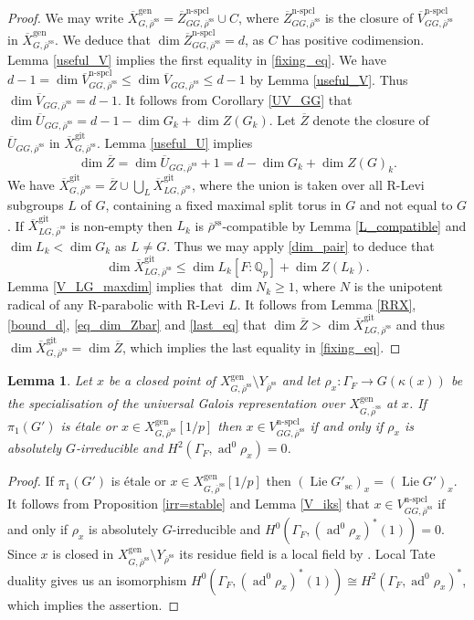 \documentclass{amsart}
\newtheorem{lem}[prop]{Lemma}
\theoremstyle{definition}
\theoremstyle{remark}
\newcommand{\Qp}{\mathbb {Q}_p}
\newcommand{\Zbar}{\overline{Z}}
\newcommand{\Vbar}{\overline{{V}}}
\DeclareMathOperator{\ad}{ad}
\newcommand{\rhobar}{\overline{\rho}}
\newcommand{\gen}{\mathrm{gen}}
\newcommand{\gps}{\mathrm{git}}
\newcommand{\Xbar}{\overline{X}}
\DeclareMathOperator{\nspcl}{n-spcl}
\DeclareMathOperator{\Lie}{Lie}
\newcommand{\rhobarss}{\rhobar^{\mathrm{ss}}}
\newcommand{\Ubar}{\overline{U}}
\newcommand{\sic}{\operatorname{sc}}
\begin{document}
\begin{proof}
We may write $\Xbar^{\gen}_{G, \rhobarss} = \Zbar^{\nspcl}_{GG, \rhobarss} \cup C$, where  $\Zbar^{\nspcl}_{GG, \rhobarss}$ is the closure of $\Vbar^{\nspcl}_{GG, \rhobarss}$ in $\Xbar^{\gen}_{G, \rhobarss}$. We deduce that $\dim \Zbar^{\nspcl}_{GG, \rhobarss}=d$, 
as $C$ has positive codimension.
Lemma \ref{useful_V} implies the first equality in \eqref{fixing_eq}. 
We have $d-1=\dim \Vbar^{\nspcl}_{GG, \rhobarss} \le \dim \Vbar_{GG, \rhobarss} \le d -1$ by Lemma \ref{useful_V}. Thus $\dim \Vbar_{GG, \rhobarss}= d-1$. 
It follows from Corollary \ref{UV_GG} that 
$\dim \Ubar_{GG, \rhobarss} = d - 1 -\dim G_k  +\dim Z(G_k).$
Let  $\Zbar$ denote the closure of $\Ubar_{GG, \rhobarss}$ in $\Xbar^{\gps}_{G, \rhobarss}$. 
Lemma \ref{useful_U} implies 
\begin{equation}\label{eq_dim_Zbar}
\dim \Zbar= \dim \Ubar_{GG, \rhobarss}+1= d- \dim G_k +\dim Z(G)_k.
\end{equation}
We have $\Xbar^{\gps}_{G, \rhobarss} = \Zbar \cup \bigcup_L \Xbar^{\gps}_{LG, \rhobarss}$, where 
the union is taken over all R-Levi subgroups $L$ of $G$,   containing a fixed maximal split torus in $G$ and not equal to $G$. If $\Xbar^{\gps}_{LG, \rhobarss}$ is non-empty then 
$L_k$ is $\rhobarss$-compatible by Lemma \ref{L_compatible} and $\dim L_k<\dim G_k$ as $L\neq G$.
Thus we may apply \eqref{dim_pair} to deduce that 
\begin{equation}\label{last_eq}
\dim \Xbar^{\gps}_{LG, \rhobarss}\le \dim L_k [F:\Qp]+ \dim Z(L_k).
\end{equation}
Lemma  \ref{V_LG_maxdim} implies that $\dim N_k \ge 1$, where $N$ is the unipotent radical of any R-parabolic with R-Levi $L$. It follows
from Lemma \ref{RRX}, \eqref{bound_d}, \eqref{eq_dim_Zbar} and \eqref{last_eq} that $\dim \Zbar > \dim \Xbar^{\gps}_{LG, \rhobarss}$ and thus $\dim \Xbar^{\gps}_{G, \rhobarss}= \dim \Zbar$, which implies the last equality in \eqref{fixing_eq}.
\end{proof}

\begin{lem}\label{abs_irr_nspcl} Let $x$ be a closed point of $X^{\gen}_{G, \rhobarss}\setminus Y_{\rhobarss}$ 
and let 
$\rho_x: \Gamma_F \rightarrow G(\kappa(x))$ be the specialisation of the universal Galois 
representation over $X^{\gen}_{G, \rhobarss}$ at $x$. If 
$\pi_1(G')$ is \'etale or 
$x\in X^{\gen}_{G,\rhobarss}[1/p]$ then $x\in V^{\nspcl}_{GG, \rhobarss}$ 
 if and only if $\rho_x$ is absolutely $G$-irreducible and $H^2(\Gamma_F, \ad^0 \rho_x)=0$. 
\end{lem}
\begin{proof} If $\pi_1(G')$ is \'etale or $x\in X^{\gen}_{G,\rhobarss}[1/p]$ then
$(\Lie G'_{\sic})_x=(\Lie G')_x$.  
It follows from Proposition \ref{irr=stable} and Lemma \ref{V_iks} that 
$x\in V^{\nspcl}_{GG, \rhobarss}$ if and only if $\rho_x$ is absolutely 
$G$-irreducible and $H^0(\Gamma_F, (\ad^0 \rho_x)^*(1))=0$. Since $x$ is closed in 
$X^{\gen}_{G, \rhobarss}\setminus Y_{\rhobarss}$ its residue field is a local field 
by \cite[Lemmas 3.17, 3.18]{BIP_new}. Local Tate duality gives us an isomorphism 
$H^0(\Gamma_F, (\ad^0 \rho_x)^*(1))\cong H^2(\Gamma_F,\ad^0 \rho_x)^*$, which implies the assertion. 
\end{proof}
\end{document}
